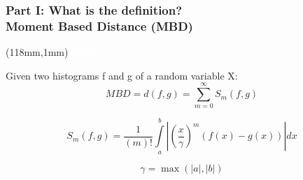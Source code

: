 \documentclass[x11names, svgnames]{beamer}
\begin{document}
\begin{frame}
\frametitle{Part I: What is the definition?\\\small{Moment Based Distance (MBD)}}
\begin{textblock*}{50mm}(118mm,1mm)
\scriptsize
\textcolor{white}{\textbf{IEEE}}
\end{textblock*}

\scriptsize

Given two histograms f and g of a random variable X:\\

\begin{equation}
MBD = d(f,g) = \sum\limits_{m=0}^{\infty} S_m(f, g)
\end{equation}

\begin{equation}
S_{m}(f,g) = \frac{1}{(m)!}\int\limits_a^{b} \left| \left( \frac{x}{\gamma} \right)^{m}(f(x) - g(x))\right|dx
\end{equation}

\begin{equation}
\gamma = \max( |a|,|b|)
\end{equation}

\end{frame}
\end{document}
